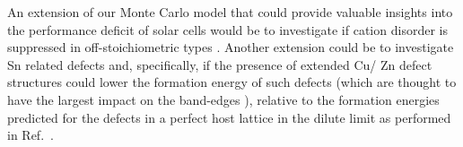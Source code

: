 \documentclass[11pt, twoside]{report}
\begin{document}
An extension of our Monte Carlo model that could provide valuable insights into the performance deficit of {\CZTS} solar cells would be to investigate if cation disorder is suppressed in off-stoichiometric {\CZTS} types \cite{CZTS_types}. Another extension could be to investigate Sn related defects and, specifically, if the presence of extended Cu/ Zn defect structures could lower the formation energy of such defects (which are thought to have the largest impact on the band-edges \cite{kesterite_band_tails}), relative to the formation energies predicted for the defects in a perfect host lattice in the dilute limit as performed in Ref.~.


\end{document}
